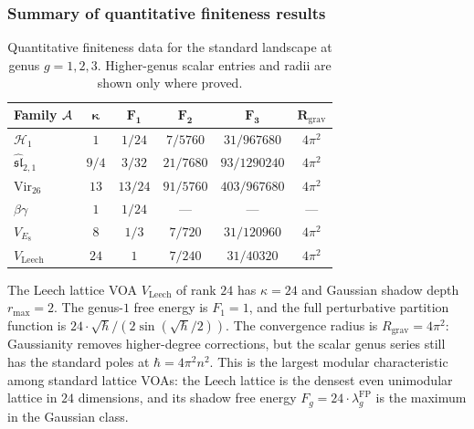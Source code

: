\subsubsection{Summary of quantitative finiteness results}

\begin{table}[ht]
\centering
\caption{Quantitative finiteness data for the standard landscape at genus $g = 1, 2, 3$. Higher-genus scalar entries and radii are shown only where proved.}
\label{tab:thqg-I-quantitative}
\renewcommand{\arraystretch}{1.4}
{\footnotesize
\begin{tabular}{|l|c|c|c|c|c|}
\hline
\textbf{Family $\mathcal{A}$} & $\boldsymbol{\kappa}$ & $\boldsymbol{F_1}$ & $\boldsymbol{F_2}$ & $\boldsymbol{F_3}$ & $\boldsymbol{R_{\mathrm{grav}}}$ \\
\hline
$\mathcal{H}_1$ & $1$ & $1/24$ & $7/5760$ & $31/967680$ & $4\pi^2$ \\
\hline
$\widehat{\mathfrak{sl}}_{2,1}$ & $9/4$ & $3/32$ & $21/7680$ & $93/1290240$ & $4\pi^2$ \\
\hline
$\mathrm{Vir}_{26}$ & $13$ & $13/24$ & $91/5760$ & $403/967680$ & $4\pi^2$ \\
\hline
$\beta\gamma$ & $1$ & $1/24$ & --- & --- & --- \\
\hline
$V_{E_8}$ & $8$ & $1/3$ & $7/720$ & $31/120960$ & $4\pi^2$ \\
\hline
$V_{\mathrm{Leech}}$ & $24$ & $1$ & $7/240$ & $31/40320$ & $4\pi^2$ \\
\hline
\end{tabular}}
\end{table}

\begin{remark}
\label{rem:thqg-I-leech}
The Leech lattice VOA $V_{\mathrm{Leech}}$ of rank $24$ has $\kappa = 24$
and Gaussian shadow depth $r_{\max} = 2$. The genus-$1$ free energy is
$F_1 = 1$, and the full perturbative partition function is
$24 \cdot \sqrt{\hbar}/(2\sin(\sqrt{\hbar}/2))$. The convergence radius
is $R_{\mathrm{grav}} = 4\pi^2$: Gaussianity removes higher-degree
corrections, but the scalar genus series still has the standard poles at
$\hbar = 4\pi^2 n^2$. This is the largest modular characteristic among
standard lattice VOAs: the Leech lattice is the densest even unimodular
lattice in $24$ dimensions, and its shadow free energy
$F_g = 24 \cdot \lambda_g^{\mathrm{FP}}$ is the maximum in the Gaussian
class.
\end{remark}

